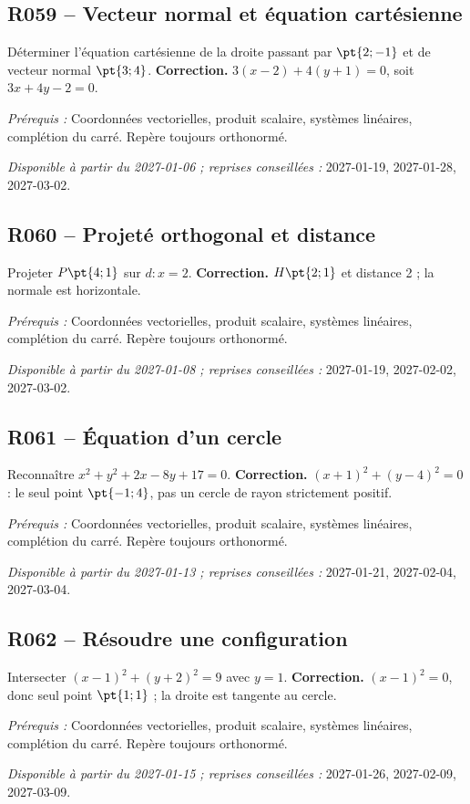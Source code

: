 \subsection*{R059 -- Vecteur normal et équation cartésienne}\label{R059}
Déterminer l’équation cartésienne de la droite passant par $\pt{2;-1}$ et de vecteur normal $\pt{3;4}$.
\ifmxteacher\textbf{Correction.} $3(x-2)+4(y+1)=0$, soit $3x+4y-2=0$.\par\textit{Prérequis :} Coordonnées vectorielles, produit scalaire, systèmes linéaires, complétion du carré. Repère toujours orthonormé.\par\textit{Disponible à partir du 2027-01-06 ; reprises conseillées :} 2027-01-19, 2027-01-28, 2027-03-02.\fi
{}\subsection*{R060 -- Projeté orthogonal et distance}\label{R060}
Projeter $P\pt{4;1}$ sur $d:x=2$.
\ifmxteacher\textbf{Correction.} $H\pt{2;1}$ et distance 2 ; la normale est horizontale.\par\textit{Prérequis :} Coordonnées vectorielles, produit scalaire, systèmes linéaires, complétion du carré. Repère toujours orthonormé.\par\textit{Disponible à partir du 2027-01-08 ; reprises conseillées :} 2027-01-19, 2027-02-02, 2027-03-02.\fi
{}\subsection*{R061 -- Équation d’un cercle}\label{R061}
Reconnaître $x^2+y^2+2x-8y+17=0$.
\ifmxteacher\textbf{Correction.} $(x+1)^2+(y-4)^2=0$ : le seul point $\pt{-1;4}$, pas un cercle de rayon strictement positif.\par\textit{Prérequis :} Coordonnées vectorielles, produit scalaire, systèmes linéaires, complétion du carré. Repère toujours orthonormé.\par\textit{Disponible à partir du 2027-01-13 ; reprises conseillées :} 2027-01-21, 2027-02-04, 2027-03-04.\fi
{}\subsection*{R062 -- Résoudre une configuration}\label{R062}
Intersecter $(x-1)^2+(y+2)^2=9$ avec $y=1$.
\ifmxteacher\textbf{Correction.} $(x-1)^2=0$, donc seul point $\pt{1;1}$ ; la droite est tangente au cercle.\par\textit{Prérequis :} Coordonnées vectorielles, produit scalaire, systèmes linéaires, complétion du carré. Repère toujours orthonormé.\par\textit{Disponible à partir du 2027-01-15 ; reprises conseillées :} 2027-01-26, 2027-02-09, 2027-03-09.\fi
